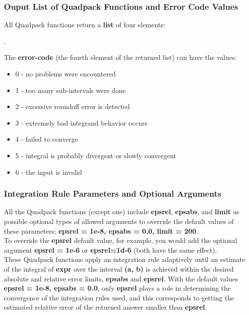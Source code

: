 \documentclass[12pt]{article}
\begin{document}
\subsubsection{Ouput List of Quadpack Functions and Error Code Values}
All Quadpack functions return a \textbf{list} of four elements: 
\begin{myVerbatim2}
 .
\end{myVerbatim2}
The \textbf{error-code} (the fourth element of the returned list) can
    have the values: 	
\begin{itemize}
\item[] 0 - no problems were encountered
\item[] 1 - too many sub-intervals were done
\item[] 2 - excessive roundoff error is detected
\item[] 3 - extremely bad integrand behavior occurs
\item[] 4 - failed to converge
\item[] 5 - integral is probably divergent or slowly convergent
\item[] 6 - the input is invalid
\end{itemize}  
\subsubsection{Integration Rule Parameters and Optional Arguments}  
All the Quadpack functions (except one) include   \textbf{epsrel}, \textbf{epsabs}, 
  and \textbf{limit} as possible optional types of allowed arguments to override
  the default values of these parameters: \textbf{epsrel = 1e-8, epsabs = 0.0, limit = 200}.\\  
To override the \textbf{epsrel} default value, for example, you would add the
  optional argument \textbf{epsrel = 1e-6} or \textbf{epsrel=1d-6} (both have the
  same effect).\\

These Quadpack functions apply an integration rule adaptively until an estimate 
   of the integral of \textbf{expr} over the interval \textbf{(a, b)} is achieved within
   the desired absolute and relative error limits, \textbf{epsabs} and \textbf{epsrel}.
With the default values \textbf{epsrel = 1e-8, epsabs = 0.0}, only \textbf{epsrel} plays
  a role in determining the convergence of the integration rules used, and this
  corresponds to getting the estimated relative error of the returned answer
  smaller than \textbf{epsrel}.\\
  
\end{document}
